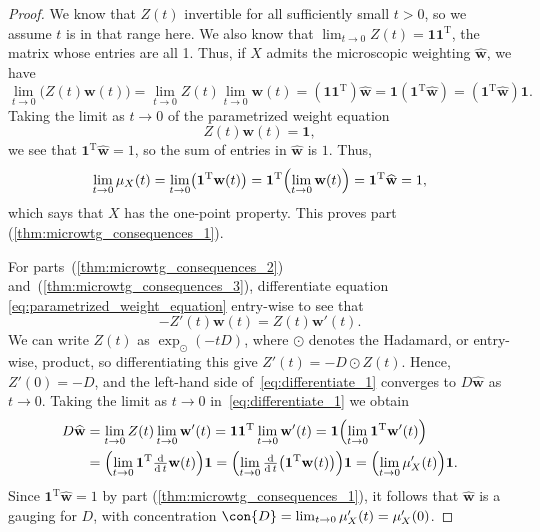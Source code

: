 \documentclass[a4paper, oneside, reqno]{amsart}
\theoremstyle{definition}
\theoremstyle{remark}
\numberwithin{equation}{section}
\renewcommand{\vec}{\mathbf}
\newcommand{\onevector}{\mathbf{1}}
\newcommand{\transpose}{\mathrm{T}}
\newcommand{\micro}{\widehat{\vec{w}}}
\begin{document}
\begin{proof}
    We know that \(Z(t)\) invertible for all sufficiently small \(t>0\), so we assume \(t\) is in that range here.  We also know that \(\lim_{t \to 0} Z(t) = \onevector \onevector^\transpose\), the matrix whose entries are all 1. Thus, if \(X\) admits the microscopic weighting \(\micro\), we have
    \[
        \lim_{t \to 0} \bigl(Z(t) \vec{w}(t)\bigr) 
        =
        \lim_{t \to 0} Z(t) \lim_{t \to 0}\vec{w}(t) 
        =
        (\onevector \onevector^\transpose) \micro
        = 
        \onevector (\onevector^\transpose \micro)
        =
        (\onevector^\transpose \micro) \onevector.
    \]
    Taking the limit as \(t \to 0\) of the parametrized weight equation
    \begin{equation}
    \label{eq:parametrized_weight_equation}
        Z(t)\vec{w}(t) = \onevector,
    \end{equation}
    we see that \(\onevector^\transpose \micro = 1\), so the sum of entries in \(\micro\) is \(1\). Thus,
    \[
        \lim_{t \to 0}\mu_X(t)
        =
        \lim_{t \to 0} \bigl( \onevector^\transpose \vec{w}(t) \bigr)
        =
        \onevector^\transpose \Bigl( \lim_{t \to 0} \vec{w}(t) \Bigr)
        =
        \onevector^\transpose \micro
        =
        1,
    \]
    which says that \(X\) has the one-point property. This proves part (\ref{thm:microwtg_consequences_1}).

    For parts~(\ref{thm:microwtg_consequences_2}) and~(\ref{thm:microwtg_consequences_3}), differentiate equation \eqref{eq:parametrized_weight_equation} entry-wise to see that
    \begin{equation}
    \label{eq:differentiate_1}
        -Z'(t)\vec{w}(t) = Z(t)\vec{w}'(t).
    \end{equation}
    We can write \(Z(t)\) as \(\exp_{{\odot}}(-tD)\), where  \(\odot\) denotes the Hadamard, or entry-wise, product, so differentiating this give
    \(
        Z'(t) = -D \odot Z(t)
    \).
    Hence,
    \(Z'(0) = -D\), and the left-hand side of~\eqref{eq:differentiate_1} converges  to \(D\micro\) as \(t \to 0\).  Taking the limit as \(t \to 0\) in~\eqref{eq:differentiate_1} we obtain
    \begin{align*}
        D\micro 
        &= \lim_{t\to 0} Z(t) \lim_{t\to 0}\vec{w}'(t) 
        = \onevector \onevector^\transpose \lim_{t \to 0} \vec{w}'(t)
        = \onevector \Bigl(\lim_{t \to 0} \onevector^\transpose \vec{w}'(t)\Bigr)
        \\
        &=
        \Bigl(\lim_{t \to 0} \onevector^\transpose \tfrac{\operatorname{d}}{\operatorname{d}t}\vec{w}(t) \Bigr) \onevector
        =
        \Bigl(\lim_{t \to 0} \tfrac{\operatorname{d}}{\operatorname{d}t}\bigl(\onevector^\transpose \vec{w}(t)\bigr) \Bigr) \onevector
        =
        \Bigl(\lim_{t \to 0} \mu_X'(t) \Bigr) \onevector.
    \end{align*}
    Since \(\onevector^\transpose \micro = 1\) by part (\ref{thm:microwtg_consequences_1}), it follows that  \(\micro\) is a gauging for \(D\), with concentration
    \(\con{D} = \lim_{t \to 0} \mu_X'(t) = \mu_X'(0)\).
\end{proof}
\end{document}
